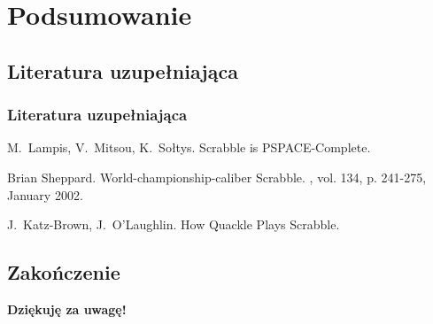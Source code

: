 \documentclass[10pt,a4paper]{beamer}
\begin{document}
\section{Podsumowanie}
\subsection{Literatura uzupełniająca}

\begin{frame}
	\frametitle<presentation>{Literatura uzupełniająca}
	\begin{thebibliography}{10}
		\beamertemplatearticlebibitems
    		M.~Lampis, V.~Mitsou, K.~Sołtys.
    		\newblock Scrabble is PSPACE-Complete.

		\beamertemplatebookbibitems
			Brian Sheppard.
			\newblock World-championship-caliber Scrabble.
			, vol. 134, p. 241-275, January 2002.
  		
  		\beamertemplatearticlebibitems
  			J.~Katz-Brown, J.~O'Laughlin.
    		\newblock How Quackle Plays Scrabble.
	\end{thebibliography}
\end{frame}

\subsection{Zakończenie}

\begin{frame}
	\begin{center}
		\LARGE{\textbf{Dziękuję za uwagę!}}
	\end{center}
\end{frame}
\end{document}
